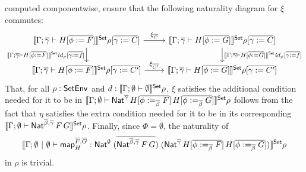 \documentclass{lmcs}
\theoremstyle{plain}\newtheorem{satz}[thm]{Satz}
\renewcommand{\id}{\mathit{id}}
\newcommand{\map}{\mathsf{map}}
\begin{document}
\begin{itemize}
computed componentwise, ensure that the following naturality diagram
for $\xi$ commutes:
{\footnotesize
\[\begin{tikzcd}
\setsem{\Gamma ;\ol{\gamma} \vdash H[\ol{\phi := F}]}\rho[\ol{\gamma
      := C}] \ar[r, "{\xi_{\ol{C}}}"]
\ar[d, "{\setsem{\Gamma ;\ol{\gamma} \vdash H[\ol{\phi :=
          F}]}\id_{\rho}[\ol{\gamma := f}]}"']
& \setsem{\Gamma ; \ol{\gamma} \vdash H[\ol{\phi := G}]}\rho[\ol{\gamma
      := C}]
\ar[d, "{\setsem{\Gamma ; \ol{\gamma} \vdash H[\ol{\phi :=
          G}]}\id_{\rho}[\ol{\gamma := f}]}"]\\
\setsem{\Gamma ;\ol{\gamma} \vdash H[\ol{\phi := F}]}\rho[\ol{\gamma
      := C'}] \ar[r, "{\xi_{\ol{C'}}}"]
& \setsem{\Gamma ; \ol{\gamma} \vdash H[\ol{\phi := G}]}\rho[\ol{\gamma
      := C'}] 
\end{tikzcd}\]}
That, for all $\rho : \mathsf{SetEnv}$ and $d : \llbracket{\Gamma; \emptyset \vdash
  \emptyset}\rrbracket^{\mathsf{Set}}\rho$, $\xi$ satisfies the additional condition needed for
it to be in $\llbracket{\Gamma; \emptyset \vdash
  \mathsf{Nat}^{\overline{\gamma}}\,H[\overline{\phi :=_{\overline{\beta}} F}]\,H[\overline{\phi
      :=_{\overline{\beta}} G}]}\rrbracket^{\mathsf{Set}}\rho$ follows from the fact
that $\eta$ satisfies the extra
condition needed for it to be in its corresponding
$\llbracket{\Gamma; \emptyset \vdash \mathsf{Nat}^{\overline{\beta},\overline{\gamma}}\,F\,G}\rrbracket^{\mathsf{Set}} \rho$.
Finally, since $\Phi = \emptyset$, the naturality of
\[
\setsem{\Gamma; \emptyset~|~\emptyset \vdash \map^{\ol{F},\ol{G}}_H
    : \Nat^\emptyset\;(\ol{\Nat^{\ol{\beta},\ol{\gamma}}\,F\,G})\;
    (\Nat^{\ol{\gamma}}\,H[\ol{\phi :=_{\ol{\beta}} F}]\,H[\ol{\phi
        :=_{\ol{\beta}} G}])}\rho
\]
in $\rho$ is trivial.



\end{itemize}
\end{document}
